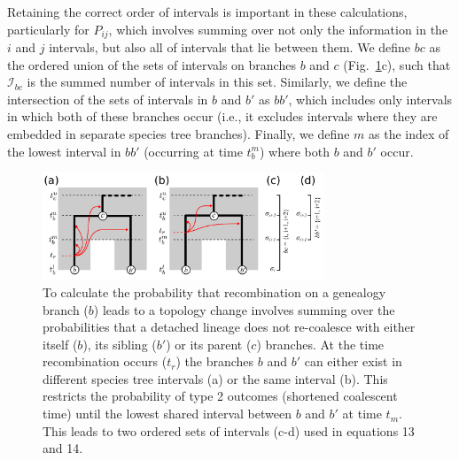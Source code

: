 \documentclass[11pt]{article}
\begin{document}
Retaining the correct order of intervals is important in these calculations, 
particularly for $P_{ij}$, which involves summing over not only the information
in the $i$ and $j$ intervals, but also all of intervals that lie between 
them. We define $bc$ as the ordered union of the sets of intervals on 
branches $b$ and $c$ (Fig.~\ref{fig:fig3}c), such that $\mathcal{I}_{bc}$ is 
the summed number of intervals in this set.
Similarly, we define the intersection of the sets of intervals in $b$
and $b'$ as $bb'$, which includes only intervals in which both of 
these branches occur (i.e., it excludes intervals where they
are embedded in separate species tree branches). Finally, we 
define $m$ as the index of the lowest interval in $bb'$ 
(occurring at time $t_b^m$) where both $b$ and $b'$ occur. 


\begin{figure}[t]
	\centering
	\includegraphics[width=0.75\textwidth]{figures/FigS1-sibling-parent-it2.pdf}
	\caption{
		To calculate the probability that recombination on a genealogy branch
		($b$) leads to a topology change involves summing over the probabilities 
		that a detached lineage does not re-coalesce with either
		itself ($b$), its sibling ($b'$) or its parent ($c$) branches. At the time 
		recombination occurs ($t_r$) the branches $b$ and $b'$ can either exist 
		in different species tree intervals (a) or the same interval (b). This 
		restricts the probability of type 2 outcomes (shortened coalescent time) 
		until the lowest shared interval between $b$ and $b'$ at time $t_m$. 
		This leads to two ordered sets of intervals (c-d) used in 
		equations 13 and 14.
	}
	\label{fig:fig3}
\end{figure}
\end{document}
